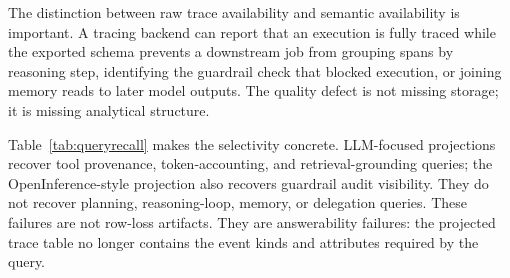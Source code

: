 \documentclass[conference]{IEEEtran}
\begin{document}
The distinction between raw trace availability and semantic
availability is important. A tracing backend can report that an
execution is fully traced while the exported schema prevents a
downstream job from grouping spans by reasoning step, identifying the
guardrail check that blocked execution, or joining memory reads to later
model outputs. The quality defect is not missing storage; it is missing
analytical structure.

Table~\ref{tab:queryrecall} makes the selectivity concrete. LLM-focused
projections recover tool provenance, token-accounting, and
retrieval-grounding queries; the OpenInference-style projection also
recovers guardrail audit visibility. They do not recover planning,
reasoning-loop, memory, or delegation queries. These failures are not
row-loss artifacts. They are answerability failures: the projected trace
table no longer contains the event kinds and attributes required by the
query.

\begin{table}[t]
\centering
\scriptsize
\caption{Structural visibility-query recall by schema projection.
$\tau$-bench action and outcome evidence are reported separately in
Table~\ref{tab:tauoutcome}.}
\label{tab:queryrecall}
\end{table}
\end{document}
